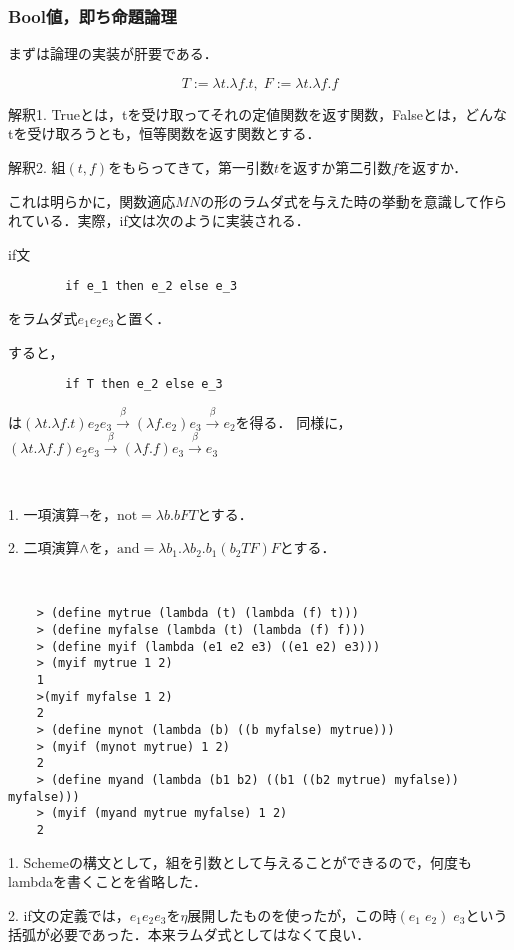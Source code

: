 \documentclass[uplatex, 12pt, dvipdfmx]{jsreport}
\begin{document}
\subsubsection{Bool値，即ち命題論理}
まずは論理の実装が肝要である．

\begin{shadebox}\begin{definition}
    \[ T := \lambda t.\lambda f.t,\; F:= \lambda t.\lambda f.f \]

    解釈1. Trueとは，tを受け取ってそれの定値関数を返す関数，Falseとは，どんなtを受け取ろうとも，恒等関数を返す関数とする．
    
    解釈2. 組$(t,f)$をもらってきて，第一引数$t$を返すか第二引数$f$を返すか．
\end{definition}\end{shadebox}
これは明らかに，関数適応$MN$の形のラムダ式を与えた時の挙動を意識して作られている．実際，if文は次のように実装される．

\begin{shadebox}\begin{definition}[if sentence]
    if文
    \begin{lstlisting}
        if e_1 then e_2 else e_3
    \end{lstlisting}
    をラムダ式$e_1e_2e_3$と置く．
\end{definition}\end{shadebox}
すると，
\begin{lstlisting}
        if T then e_2 else e_3
\end{lstlisting}
は$(\lambda t.\lambda f.t)e_2e_3\xrightarrow{\beta}(\lambda f.e_2)e_3\xrightarrow{\beta}e_2$を得る．
同様に，$(\lambda t.\lambda f.f)e_2e_3\xrightarrow{\beta}(\lambda f.f)e_3\xrightarrow{\beta}e_3$

\begin{definition}　

    1. 一項演算$\lnot$を，$\mathrm{not}=\lambda b.bFT$とする．
    
    2. 二項演算$\land$を，$\mathrm{and}=\lambda b_1.\lambda b_2.b_1(b_2TF)F$とする．
\end{definition}

\begin{example}[Scheme]　

    \begin{lstlisting}
    > (define mytrue (lambda (t) (lambda (f) t)))
    > (define myfalse (lambda (t) (lambda (f) f)))
    > (define myif (lambda (e1 e2 e3) ((e1 e2) e3)))
    > (myif mytrue 1 2)
    1
    >(myif myfalse 1 2)
    2
    > (define mynot (lambda (b) ((b myfalse) mytrue)))
    > (myif (mynot mytrue) 1 2)
    2
    > (define myand (lambda (b1 b2) ((b1 ((b2 mytrue) myfalse)) myfalse)))
    > (myif (myand mytrue myfalse) 1 2)
    2
    \end{lstlisting}
    1. Schemeの構文として，組を引数として与えることができるので，何度もlambdaを書くことを省略した．

    2. if文の定義では，$e_1e_2e_3$を$\eta$展開したものを使ったが，この時$(e_1\;e_2)\;e_3$という括弧が必要であった．本来ラムダ式としてはなくて良い．
\end{example}
\end{document}
